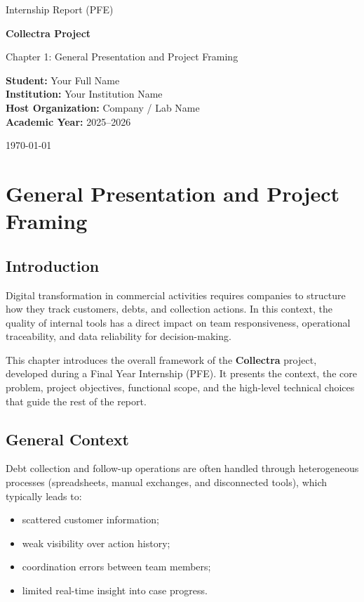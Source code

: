 \documentclass[12pt,a4paper]{report}
\begin{document}
\begin{titlepage}
  \centering
  {\Large Internship Report (PFE)\par}
  \vspace{1.5cm}
  {\huge \textbf{Collectra Project}\par}
  \vspace{0.5cm}
  {\Large Chapter 1: General Presentation and Project Framing\par}
  \vfill

  \begin{flushleft}
    \textbf{Student:} Your Full Name \\
    \textbf{Institution:} Your Institution Name \\
    \textbf{Host Organization:} Company / Lab Name \\
    \textbf{Academic Year:} 2025--2026
  \end{flushleft}

  \vfill
  {\large \today\par}
\end{titlepage}

\tableofcontents
\clearpage

\chapter{General Presentation and Project Framing}
\label{chap:general-presentation}

\section*{Introduction}
Digital transformation in commercial activities requires companies to structure how they track customers, debts, and collection actions. In this context, the quality of internal tools has a direct impact on team responsiveness, operational traceability, and data reliability for decision-making.

This chapter introduces the overall framework of the \textbf{Collectra} project, developed during a Final Year Internship (PFE). It presents the context, the core problem, project objectives, functional scope, and the high-level technical choices that guide the rest of the report.

\section{General Context}
Debt collection and follow-up operations are often handled through heterogeneous processes (spreadsheets, manual exchanges, and disconnected tools), which typically leads to:
\begin{itemize}
  \item scattered customer information;
  \item weak visibility over action history;
  \item coordination errors between team members;
  \item limited real-time insight into case progress.
\end{itemize}
\end{document}
